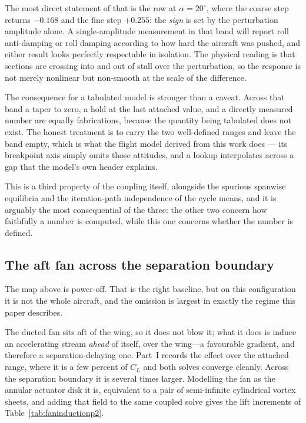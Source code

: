 \documentclass[submit]{aiaa-tc}
\begin{document}
The most direct statement of that is the row at $\alpha = 20^\circ$,
where the coarse step returns $-0.168$ and the fine step $+0.255$: the
\emph{sign} is set by the perturbation amplitude alone. A single-amplitude
measurement in that band will report roll anti-damping or roll damping
according to how hard the aircraft was pushed, and either result looks
perfectly respectable in isolation. The physical reading is that sections
are crossing into and out of stall over the perturbation, so the response
is not merely nonlinear but non-smooth at the scale of the difference.

The consequence for a tabulated model is stronger than a caveat. Across
that band a taper to zero, a hold at the last attached value, and a
directly measured number are equally fabrications, because the quantity
being tabulated does not exist. The honest treatment is to carry the two
well-defined ranges and leave the band empty, which is what the flight
model derived from this work does --- its breakpoint axis simply omits
those attitudes, and a lookup interpolates across a gap that the model's
own header explains.

This is a third property of the coupling itself, alongside the spurious
spanwise equilibria and the iteration-path independence of the cycle
means, and it is arguably the most consequential of the three: the other
two concern how faithfully a number is computed, while this one concerns
whether the number is defined.

\subsection{The aft fan across the separation boundary}
\label{sec:faninduction}

The map above is power-off. That is the right baseline, but on this
configuration it is not the whole aircraft, and the omission is largest
in exactly the regime this paper describes.

The ducted fan sits aft of the wing, so it does not blow it; what it does
is induce an accelerating stream \emph{ahead} of itself, over the wing---a
favourable gradient, and therefore a separation-delaying one. Part~I
records the effect over the attached range, where it is a few percent of
$C_L$ and both solves converge cleanly. Across the separation boundary it
is several times larger. Modelling the fan as the annular actuator disk
it is, equivalent to a pair of semi-infinite cylindrical vortex sheets,
and adding that field to the same coupled solve gives the lift increments
of Table~\ref{tab:faninductionp2}.
\end{document}
